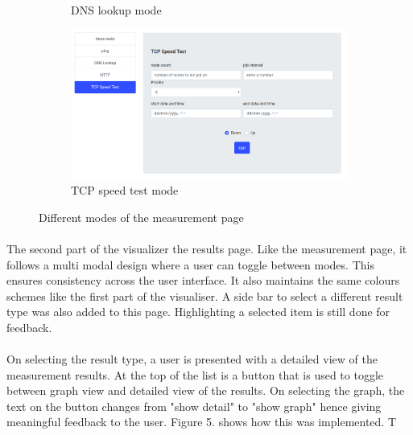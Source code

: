 \begin{figure}
\begin{subfigure}{.5\textwidth}
	\caption{DNS lookup mode}
	\label{fig:sfig4}
\end{subfigure}
\begin{subfigure}{.5\textwidth}
	\centering
	\includegraphics[width=.8\linewidth]{images/tcp}
	\caption{TCP speed test mode}
	\label{fig:sfig5}
\end{subfigure}
	\caption{Different modes of the measurement page}
	\label{fig:fig}
\end{figure}

\paragraph{}
The second part of the visualizer the results page. Like the measurement page, it follows a multi modal design where a user can toggle between modes. This ensures consistency across the user interface\cite{goldenrules}. It also maintains the same colours schemes like the first part of the visualiser. A side bar to select a different result type was also added to this page. Highlighting a selected item is still done for feedback.
\paragraph{}
On selecting the result type, a user is presented with a detailed view of the measurement results. At the top of the list is a button that is used to toggle between graph view and detailed view of the results. On selecting the graph, the text on the button changes from "show detail" to "show graph" hence giving meaningful feedback to the user. Figure 5. shows how this was implemented. T











